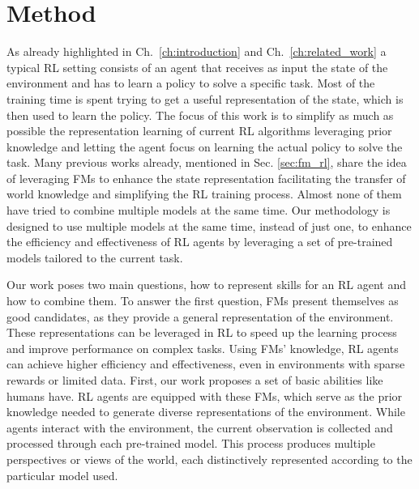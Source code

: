 
\chapter{Method}
\label{ch:method}
As already highlighted in Ch.~\ref{ch:introduction} and Ch.~\ref{ch:related_work}
a typical RL setting consists of an agent that receives as input the state of the environment and has to learn a policy to solve a specific task.
Most of the training time is spent trying to get a useful representation of the state, which is then used to learn the policy.
The focus of this work is to simplify as much as possible the representation learning of current RL algorithms leveraging prior knowledge and letting the agent focus on learning the actual policy to solve the task.
Many previous works already, mentioned in Sec. \ref{sec:fm_rl}, share the idea of leveraging FMs to enhance the state representation facilitating the transfer of world knowledge and simplifying the RL training process.
Almost none of them have tried to combine multiple models at the same time.
Our methodology is designed to use multiple models at the same time, instead of just one, to enhance the efficiency and effectiveness of RL agents by leveraging a set of pre-trained models tailored to the current task.

Our work poses two main questions, how to represent skills for an RL agent and how to combine them.
To answer the first question, FMs present themselves as good candidates, as they provide a general representation of the environment.
These representations can be leveraged in RL to speed up the learning process and improve performance on complex tasks.
Using FMs' knowledge, RL agents can achieve higher efficiency and effectiveness, even in environments with sparse rewards or limited data.
First, our work proposes a set of basic abilities like humans have.
RL agents are equipped with these FMs, which serve as the prior knowledge needed to generate diverse representations of the environment.
While agents interact with the environment, the current observation is collected and processed through each pre-trained model.
This process produces multiple perspectives or views of the world, each distinctively represented according to the particular model used.


